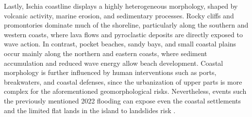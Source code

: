\documentclass[10pt, twocolumn, twoside]{article}
\begin{document}
Lastly, Ischia coastline displays a highly heterogeneous morphology, shaped by volcanic activity, marine erosion, and sedimentary processes. Rocky cliffs and promontories dominate much of the shoreline, particularly along the southern and western coasts, where lava flows and pyroclastic deposits are directly exposed to wave action. In contrast, pocket beaches, sandy bays, and small coastal plains occur mainly along the northern and eastern coasts, where sediment accumulation and reduced wave energy allow beach development. Coastal morphology is further influenced by human interventions such as ports, breakwaters, and coastal defenses, since the urbanization of upper parts is more complex for the aforementioned geomorphological risks. Nevertheless, events such the previously mentioned 2022 flooding can expose even the coastal settlements and the limited flat lands in the island to landslides risk \cite{massaro}.  



  
\end{document}
